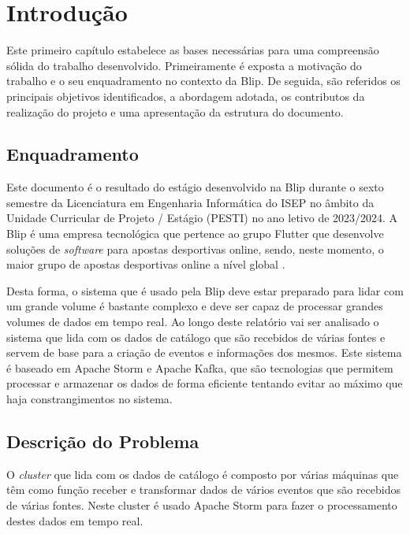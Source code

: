 \chapter{Introdução} 	
\label{sec:1-Introducao} %

Este primeiro capítulo estabelece as bases necessárias para uma compreensão sólida do trabalho 
desenvolvido. Primeiramente é exposta a motivação do trabalho e o seu enquadramento no contexto
da Blip. De seguida, são referidos os principais objetivos identificados, a abordagem adotada, 
os contributos da realização do projeto e uma apresentação da estrutura do documento.

\section{Enquadramento}

Este documento é o resultado do estágio desenvolvido na Blip durante o sexto semestre da Licenciatura 
em Engenharia Informática do ISEP no âmbito da Unidade Curricular de Projeto / Estágio (PESTI) 
no ano letivo de 2023/2024. A Blip é uma empresa tecnológica que pertence ao grupo Flutter
que desenvolve soluções de \textit{software} para apostas desportivas online, sendo, 
neste momento, o maior grupo de apostas desportivas online a nível global \cite{blip}.

Desta forma, o sistema que é usado pela Blip deve estar preparado para lidar com um grande volume
é bastante complexo e deve ser capaz de processar grandes volumes de dados em tempo real. Ao longo
deste relatório vai ser analisado o sistema que lida com os dados de catálogo que são recebidos de
várias fontes e servem de base para a criação de eventos e informações dos mesmos. Este sistema é
baseado em Apache Storm e Apache Kafka, que são tecnologias que permitem processar e armazenar os
dados de forma eficiente tentando evitar ao máximo que haja constrangimentos no sistema.

\section{Descrição do Problema}

O \textit{cluster} que lida com os dados de catálogo é composto por várias máquinas que têm
como função receber e transformar dados de vários eventos que são recebidos de várias fontes.
Neste cluster é usado Apache Storm para fazer o processamento destes dados em tempo real.

